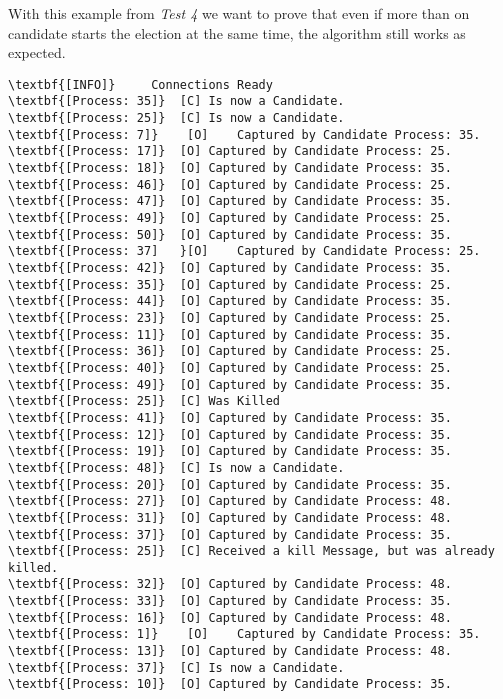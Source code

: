 	With this example from \textit{Test 4} we want to prove that even if more than on candidate starts the election at the same time, the algorithm still works as expected.

	\vspace{10pt}
	
	\begin{Verbatim}[commandchars=\\\{\},codes={\catcode`$=3\catcode`_=8},frame=single,label=Test 6 output]
\textbf{[INFO]}	  	Connections Ready
\textbf{[Process: 35]}	[C]	Is now a Candidate.
\textbf{[Process: 25]}	[C]	Is now a Candidate.
\textbf{[Process: 7]}	 [O]	Captured by Candidate Process: 35.
\textbf{[Process: 17]}	[O]	Captured by Candidate Process: 25.
\textbf{[Process: 18]}	[O]	Captured by Candidate Process: 35.
\textbf{[Process: 46]}	[O]	Captured by Candidate Process: 25.
\textbf{[Process: 47]}	[O]	Captured by Candidate Process: 35.
\textbf{[Process: 49]}	[O]	Captured by Candidate Process: 25.
\textbf{[Process: 50]}	[O]	Captured by Candidate Process: 35.
\textbf{[Process: 37]	}[O]	Captured by Candidate Process: 25.
\textbf{[Process: 42]}	[O]	Captured by Candidate Process: 35.
\textbf{[Process: 35]}	[O]	Captured by Candidate Process: 25.
\textbf{[Process: 44]}	[O]	Captured by Candidate Process: 35.
\textbf{[Process: 23]}	[O]	Captured by Candidate Process: 25.
\textbf{[Process: 11]}	[O]	Captured by Candidate Process: 35.
\textbf{[Process: 36]}	[O]	Captured by Candidate Process: 25.
\textbf{[Process: 40]}	[O]	Captured by Candidate Process: 25.
\textbf{[Process: 49]}	[O]	Captured by Candidate Process: 35.
\textbf{[Process: 25]}	[C]	Was Killed
\textbf{[Process: 41]}	[O]	Captured by Candidate Process: 35.
\textbf{[Process: 12]}	[O]	Captured by Candidate Process: 35.
\textbf{[Process: 19]}	[O]	Captured by Candidate Process: 35.
\textbf{[Process: 48]}	[C]	Is now a Candidate.
\textbf{[Process: 20]}	[O]	Captured by Candidate Process: 35.
\textbf{[Process: 27]}	[O]	Captured by Candidate Process: 48.
\textbf{[Process: 31]}	[O]	Captured by Candidate Process: 48.
\textbf{[Process: 37]}	[O]	Captured by Candidate Process: 35.
\textbf{[Process: 25]}	[C]	Received a kill Message, but was already killed.
\textbf{[Process: 32]}	[O]	Captured by Candidate Process: 48.
\textbf{[Process: 33]}	[O]	Captured by Candidate Process: 35.
\textbf{[Process: 16]}	[O]	Captured by Candidate Process: 48.
\textbf{[Process: 1]}	 [O]	Captured by Candidate Process: 35.
\textbf{[Process: 13]}	[O]	Captured by Candidate Process: 48.
\textbf{[Process: 37]}	[C]	Is now a Candidate.
\textbf{[Process: 10]}	[O]	Captured by Candidate Process: 35.

\end{Verbatim}
